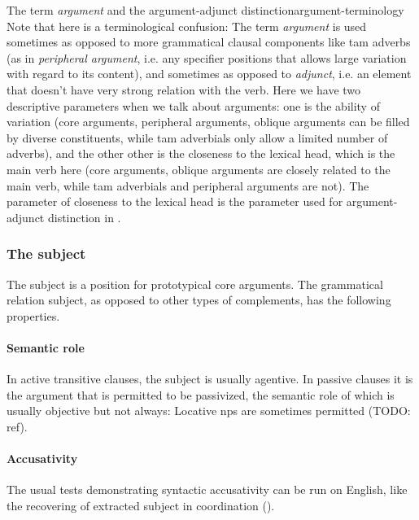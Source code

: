 \documentclass[UTF8, a4paper, oneside, scheme=plain]{ctexrep}
\newcommand*{\term}[1]{\emph{#1}}
\begin{document}
\begin{infobox}{The term \term{argument} and the argument-adjunct distinction}{argument-terminology}
    Note that here is a terminological confusion:
    The term \term{argument} is used sometimes 
    as opposed to more grammatical clausal components like \acs{tam} adverbs
    (as in \term{peripheral argument}, 
    i.e. any specifier positions that allows large variation with regard to its content),
    and sometimes as opposed to \term{adjunct},
    i.e. an element that doesn't have very strong relation with the verb.
    Here we have two descriptive parameters when we talk about arguments:
    one is the ability of variation
    (core arguments, peripheral arguments, oblique arguments can be filled by diverse constituents,
    while \acs{tam} adverbials only allow a limited number of adverbs),
    and the other other is the closeness to the lexical head, which is the main verb here 
    (core arguments, oblique arguments are closely related to the main verb,
    while \acs{tam} adverbials and peripheral arguments are not).
    The parameter of closeness to the lexical head is the parameter used for argument-adjunct distinction
    in .
\end{infobox}

\subsubsection{The subject}\label{sec:simple-clause.subject}

The subject is a position for prototypical core arguments.
The grammatical relation subject, as opposed to other types of complements, 
has the following properties.

\paragraph{Semantic role}

In active transitive clauses, 
the subject is usually agentive.
In passive clauses it is the argument that is permitted to be passivized,
the semantic role of which is usually objective but not always:
Locative \acs{np}s are sometimes permitted (TODO: ref).

\paragraph{Accusativity}\label{sec:simple-clause.subject.accusative}

The usual tests demonstrating syntactic accusativity can be run on English,
like the recovering of extracted subject in coordination ().
\end{document}
